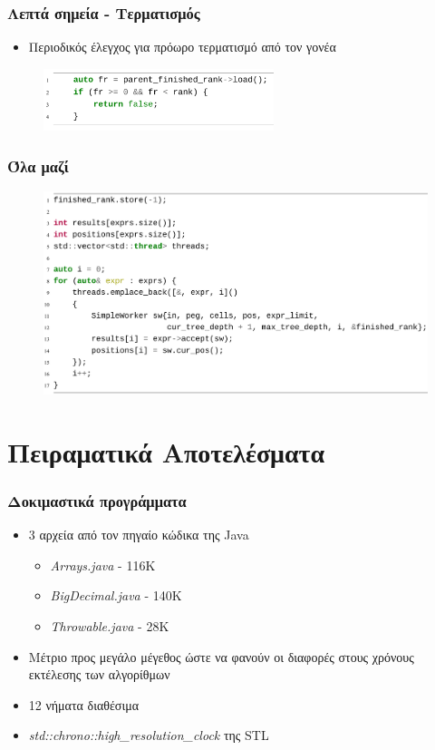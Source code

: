 \documentclass{beamer}
\begin{document}
\begin{frame}
  \frametitle{Λεπτά σημεία - Τερματισμός}

  \begin{itemize}
	\item Περιοδικός έλεγχος για πρόωρο τερματισμό από τον γονέα \pause
  \end{itemize}
\begin{figure}[h]
    \centering
	\includegraphics[width=0.60\textwidth]{pics/termination}
\end{figure} 
\end{frame}


\begin{frame}
  \frametitle{Όλα μαζί}

\begin{figure}[h]
    \centering
	\includegraphics[width=1.05\textwidth]{pics/spawn}
\end{figure} 
\end{frame}

\section{Πειραματικά Αποτελέσματα}

\begin{frame}
  \frametitle{Δοκιμαστικά προγράμματα}
\begin{itemize}
  \item 3 αρχεία από τον πηγαίο κώδικα της Java
\begin{itemize}
  \item \textit{Arrays.java} - 116K 
  \item \textit{BigDecimal.java} - 140K 
  \item \textit{Throwable.java} - 28K 
\end{itemize}
\item Mέτριο προς μεγάλο μέγεθος ώστε να φανούν οι διαφορές στους χρόνους εκτέλεσης των αλγορίθμων
\item 12 νήματα διαθέσιμα
\item \textit{std::chrono::high\_resolution\_clock} της STL
\end{itemize}
\end{frame}
\end{document}

